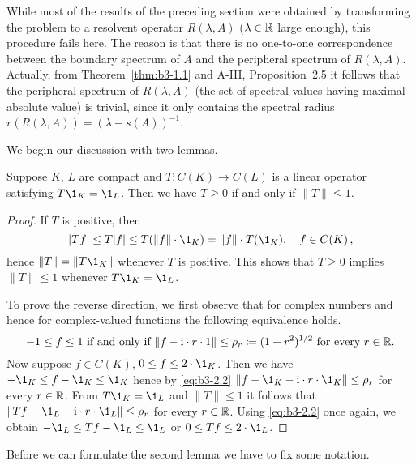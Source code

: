 While most of the results of the preceding section were obtained by transforming the problem to a resolvent operator $R(\lambda,A)$ ($\lambda \in \mathbb{R}$ large enough), this procedure fails here.
The reason is that there is no one-to-one correspondence between the boundary spectrum of $A$ and the peripheral spectrum of $R(\lambda,A)$.
Actually, from Theorem~\ref{thm:b3-1.1} and A-III, Proposition~2.5 it follows that the peripheral spectrum of $R(\lambda,A)$ (\ie the set of spectral values having maximal absolute value) is trivial, since it only contains the spectral radius $r(R(\lambda,A)) = (\lambda - s(A))^{-1}$.

We begin our discussion with two lemmas.
\begin{lemma}\label{lem:b3-2.1}
	Suppose $K$, $L$ are compact and $T \colon C(K) \to C(L)$ is a linear operator satisfying $T \1_{K} = \1_{L}$.
	Then we have $T \geq 0$ if and only if $\|T\| \leq 1$.
\end{lemma}
\begin{proof}
	If $T$ is positive, then
	\begin{equation}\label{eq:b3-2.1}
	|Tf| \leq T|f| \leq T(\|f\|\cdot \1_{K}) = \|f\|\cdot T(\1_{K}), \quad f \in C(K)\,,
	\end{equation}
	hence $\|T\| = \|T\1_{K}\|$ whenever $T$ is positive.
	This shows that $T \geq 0$ implies $\|T\| \leq 1$ whenever $T\1_{K} = \1_{L}$.
	
	To prove the reverse direction, we first observe that for complex numbers and hence for complex-valued functions the following equivalence holds.
	\begin{equation}\label{eq:b3-2.2}
	-1 \leq f \leq 1 \text{ if and only if } \|f - \mathrm{i}\cdot r\cdot 1\| \leq \rho_{r} \coloneqq (1+r^{2})^{1/2} \text{ for every } r \in \mathbb{R}.
	\end{equation}
	Now suppose $f \in C(K)$, $0 \leq f \leq 2\cdot \1_{K}$.
	Then we have $-\1_{K} \leq f - \1_{K} \leq \1_{K}$ hence by \eqref{eq:b3-2.2} $\|f - \1_{K} - \im\cdot r\cdot \1_{K}\| \leq \rho_{r}$ for every $r \in \mathbb{R}$.
	From $T\1_{K} = \1_{L}$ and $\|T\| \leq 1$ it follows that $\|Tf - \1_{L} - \im\cdot r\cdot \1_{L}\| \leq \rho_{r}$ for every $r \in \mathbb{R}$.
	Using \eqref{eq:b3-2.2} once again, we obtain $-\1_{L} \leq Tf - \1_{L} \leq \1_{L}$ or $0 \leq Tf \leq 2\cdot \1_{L}$.
\end{proof}
Before we can formulate the second lemma we have to fix some notation.
